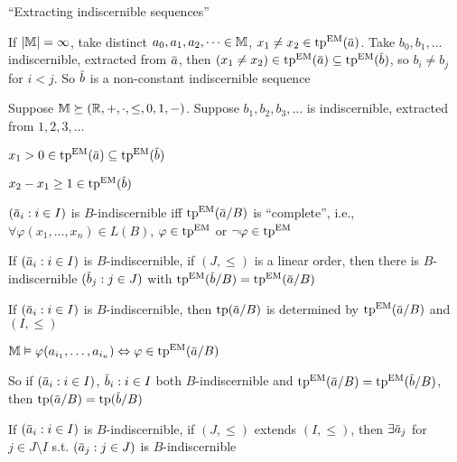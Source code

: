\documentclass[11pt]{article}
\begin{document}
``Extracting indiscernible sequences''

\begin{examplle}[=Theorem 17 last week]
If \(\abs{\M}=\infty\), take distinct \(a_0,a_1,a_2,\dots\in\mathbb{M}\), \(x_1\neq x_2\in\tp^{\EM}(\bara)\).
Take \(b_0,b_1,\dots\) indiscernible, extracted from \(\bara\),
then \((x_1\neq x_2)\in\tp^{\EM}(\bara)\subseteq\tp^{\EM}(\barb)\), so \(b_i\neq b_j\) for \(i<j\). So \(\barb\) is
a non-constant indiscernible sequence
\end{examplle}

\begin{examplle}[]
Suppose \(\mathbb{M}\succeq(\mathbb{R},+,\cdot,\le,0,1,-)\). Suppose \(b_1,b_2,b_3,\dots\) is indiscernible, extracted
from \(1,2,3,\dots\)

\(x_1>0\in\tp^{\EM}(\bara)\subseteq\tp^{\EM}(\barb)\)

\(x_2-x_1\ge 1\in\tp^{\EM}(\barb)\)
\end{examplle}

\begin{remark}
\((\bara_i:i\in I)\) is \(B\)-indiscernible iff \(\tp^{\EM}(\bara/B)\) is ``complete'',
i.e., \(\forall\varphi(x_1,\dots,x_n)\in L(B)\), \(\varphi\in\operatorname{tp}^{\operatorname{EM}}\) or \(\neg\varphi\in\operatorname{tp}^{\operatorname{EM}}\)
\end{remark}

\begin{theorem}[]
If \((\bara_i:i\in I)\) is \(B\)-indiscernible, if \((J,\le)\) is a linear order, then there
is \(B\)-indiscernible \((\barb_j:j\in J)\) with \(\tp^{\EM}(\barb/B)=\tp^{\EM}(\bara/B)\)
\end{theorem}

\begin{remark}
If \((\bara_i:i\in I)\) is \(B\)-indiscernible, then \(\tp(\bara/B)\) is determined
by \(\tp^{\EM}(\bara/B)\) and \((I,\le)\)

\(\M\vDash\varphi(a_{i_1},\dots,a_{i_n})\Leftrightarrow\varphi\in\tp^{\EM}(\bara/B)\)

So if \((\bara_i:i\in I)\), \(\barb_i:i\in I\) both \(B\)-indiscernible
and \(\tp^{\EM}(\bara/B)=\tp^{\EM}(\barb/B)\), then \(\tp(\bara/B)=\tp(\barb/B)\)
\end{remark}

\begin{theorem}
If \((\bara_i:i\in I)\) is \(B\)-indiscernible, if \((J,\le)\) extends \((I,\le)\), then \(\exists\bara_j\)
for \(j\in J\setminus I\) s.t. \((\bara_j:j\in J)\) is \(B\)-indiscernible
\end{theorem}
\end{document}
